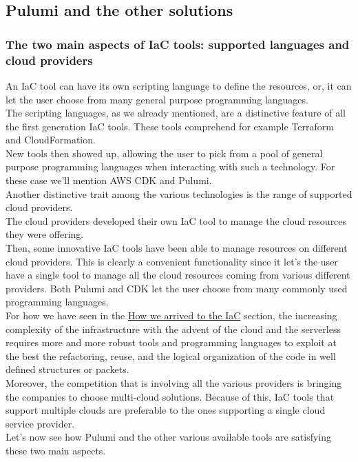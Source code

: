 \subsection{Pulumi and the other solutions}

\subsubsection{The two main aspects of IaC tools: supported languages and cloud providers}
An IaC tool can have its own scripting language to define the resources, or, it can let the user choose from many general purpose programming languages.\\
The scripting languages, as we already mentioned, are a distinctive feature of all the first generation IaC tools.
These tools comprehend for example Terraform and CloudFormation.\\
New tools then showed up, allowing the user to pick from a pool of general purpose programming languages when interacting with such a technology.
For these case we'll mention AWS CDK and Pulumi.\\
\newline
Another distinctive trait among the various technologies is the range of supported cloud providers.\\
The cloud providers developed their own IaC tool to manage the cloud resources they were offering.\\
Then, some innovative IaC tools have been able to manage resources on different cloud providers.
This is clearly a convenient functionality since it let's the user have a single tool to manage all the cloud resources coming from various different providers.
Both Pulumi and CDK let the user choose from many commonly used programming languages.\\
\newline
For how we have seen in the \hyperref[sec:story-iac]{How we arrived to the IaC} section, the increasing complexity of the infrastructure with the advent of the cloud and the serverless requires more and more robust tools and programming languages to exploit at the best the refactoring, reuse, and the logical organization of the code in well defined structures or packets.\\
Moreover, the competition that is involving all the various providers is bringing the companies to choose multi-cloud solutions. Because of this, IaC tools that support multiple clouds are preferable to the ones supporting a single cloud service provider.\\
Let's now see how Pulumi and the other various available tools are satisfying these two main aspects.

